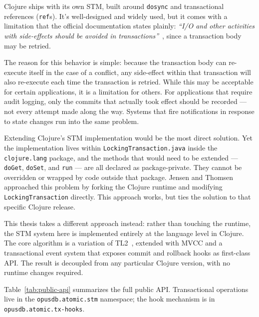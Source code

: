 Clojure ships with its own STM, built around \texttt{dosync} and
transactional references (\texttt{ref}s). It's well-designed and widely
used, but it comes with a limitation that the official
documentation states plainly: \textit{``I/O and other activities with
  side-effects should be avoided in transactions''}~\cite{clojureRefs},
since a transaction body may be retried.

The reason for this behavior is simple: because the transaction body
can re-execute itself in the case of a conflict, any side-effect within
that transaction will also re-execute each time the transaction is
retried. While this may be acceptable for certain applications, it is
a limitation for others. For applications that require audit logging,
only the commits that actually took effect should be recorded --- not
every attempt made along the way. Systems that fire notifications in
response to state changes run into the same problem.

Extending Clojure's STM implementation would be the most direct
solution. Yet the implementation lives within
\texttt{LockingTransaction.java} inside the \texttt{clojure.lang}
package, and the methods that would need to be extended ---
\texttt{doGet}, \texttt{doSet}, and \texttt{run} --- are all declared
as package-private. They cannot be overridden or wrapped by code outside
that package. Jensen and Thomsen~\cite{jensen2016} approached this
problem by forking the Clojure runtime and modifying
\texttt{LockingTransaction} directly. This approach works, but ties
the solution to that specific Clojure release.

This thesis takes a different approach instead: rather than touching the runtime,
the STM system here is implemented entirely at the language level in Clojure.
The core algorithm is a variation of TL2~\cite{dice2006transactional}, extended
with MVCC and a transactional event system that exposes commit and rollback
hooks as first-class API. The result is decoupled from any particular
Clojure version, with no runtime changes required.

Table~\ref{tab:public-api} summarizes the full public API. Transactional
operations live in the \texttt{opusdb.atomic.stm} namespace; the hook
mechanism is in \texttt{opusdb.atomic.tx-hooks}.


